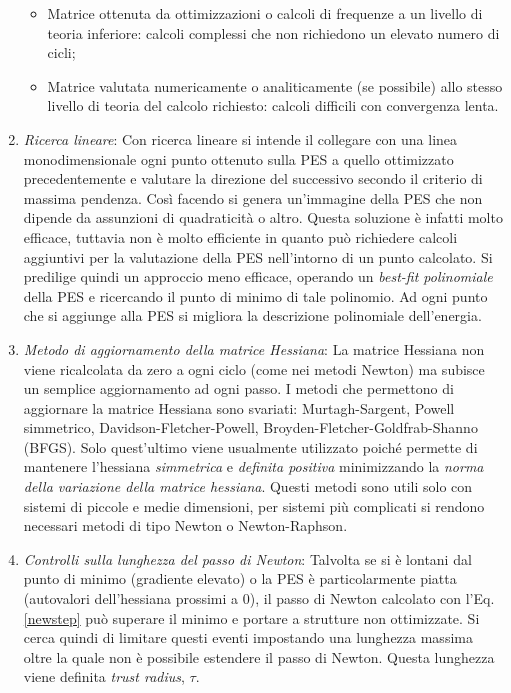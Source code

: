 \documentclass[oneside]{amsbook}
\numberwithin{section}{chapter}
\numberwithin{equation}{section}
\numberwithin{figure}{section}
\begin{document}
\begin{enumerate}
\begin{itemize}
\item Matrice ottenuta da ottimizzazioni o calcoli di frequenze a un livello di teoria inferiore: calcoli complessi che non richiedono un elevato numero di cicli;
\item Matrice valutata numericamente o analiticamente (se possibile) allo stesso livello di teoria del calcolo richiesto: calcoli difficili con convergenza lenta.
\end{itemize}
\item \emph{Ricerca lineare}: Con ricerca lineare si intende il collegare con una linea monodimensionale ogni punto ottenuto sulla PES  a quello ottimizzato precedentemente e valutare la direzione del successivo secondo il criterio di massima pendenza. Così facendo si genera un'immagine della PES che non dipende da assunzioni di quadraticità o altro. Questa soluzione è infatti molto efficace, tuttavia non è molto efficiente in quanto può richiedere calcoli aggiuntivi per la valutazione della PES  nell'intorno di un punto calcolato. Si predilige quindi un approccio meno efficace, operando un \emph{best-fit polinomiale} della PES e ricercando il punto di minimo di tale polinomio. Ad ogni punto che si aggiunge alla PES si migliora la descrizione polinomiale dell'energia.
\item \emph{Metodo di aggiornamento della matrice Hessiana}: La matrice Hessiana non viene ricalcolata da zero a ogni ciclo (come nei metodi Newton) ma subisce un semplice aggiornamento ad ogni passo. I metodi che permettono di aggiornare la matrice Hessiana sono svariati: Murtagh-Sargent, Powell simmetrico, Davidson-Fletcher-Powell, Broyden-Fletcher-Goldfrab-Shanno (BFGS). Solo quest'ultimo viene usualmente utilizzato poiché permette di mantenere l'hessiana \emph{simmetrica} e \emph{definita positiva} minimizzando la \emph{norma della variazione della matrice hessiana}. Questi metodi sono utili solo con sistemi di piccole e medie dimensioni, per sistemi più complicati si rendono necessari metodi di tipo Newton o Newton-Raphson.
\item \emph{Controlli sulla lunghezza del passo di Newton}: Talvolta se si è lontani dal punto di minimo (gradiente elevato) o la PES è particolarmente piatta (autovalori dell'hessiana prossimi a 0), il passo di Newton calcolato con l'Eq.\ref{newstep} può superare il minimo e portare a strutture non ottimizzate. Si cerca quindi di limitare questi eventi impostando una lunghezza massima oltre la quale non è possibile estendere il passo di Newton. Questa lunghezza viene definita \emph{trust radius}, $\tau$.
\end{enumerate}
\end{document}
